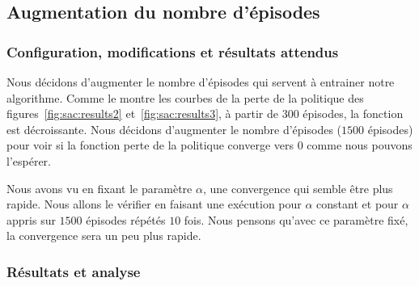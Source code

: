 \subsection{Augmentation du nombre d'épisodes}

\subsubsection{Configuration, modifications et résultats attendus}

Nous décidons d'augmenter le nombre d'épisodes qui servent à entrainer notre
algorithme. Comme le montre les courbes de la perte de la politique des
figures~\ref{fig:sac:results2} et~\ref{fig:sac:results3}, à partir de \(300\)
épisodes, la fonction est décroissante. Nous décidons d'augmenter le nombre
d'épisodes (\(1500\) épisodes) pour voir si la fonction perte de la politique
converge vers \(0\) comme nous pouvons l'espérer.

Nous avons vu en fixant le paramètre \(\alpha\), une convergence qui semble être
plus rapide. Nous allons le vérifier en faisant une exécution pour \(\alpha\)
constant et pour \(\alpha\) appris sur \(1500\) épisodes répétés \(10\) fois. Nous pensons
qu'avec ce paramètre fixé, la convergence sera un peu plus rapide.

\subsubsection{Résultats et analyse}

